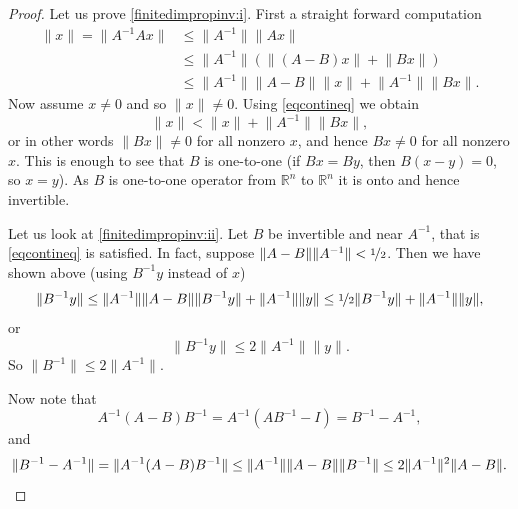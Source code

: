 \documentclass[12pt]{book}
\newcommand{\snorm}[1]{\lVert {#1} \rVert}
\newcommand{\R}{{\mathbb{R}}}
\theoremstyle{plain}
\theoremstyle{remark}
\theoremstyle{definition}
\theoremstyle{exercise}
\theoremstyle{example}
\begin{document}
\begin{proof}
Let us prove \ref{finitedimpropinv:i}.  First a straight forward computation
\begin{equation*}
\begin{split}
\snorm{x} =
\snorm{A^{-1}Ax}
& \leq
\snorm{A^{-1}} \snorm{Ax}
\\
& \leq
\snorm{A^{-1}} ( \snorm{(A-B)x} + \snorm{Bx} )
\\
& \leq
\snorm{A^{-1}}\snorm{A-B} \snorm{x} + \snorm{A^{-1}}\snorm{Bx} .
\end{split}
\end{equation*}
Now assume $x \neq 0$ and so $\snorm{x} \neq 0$.
Using \eqref{eqcontineq} we obtain
\begin{equation*}
\snorm{x} < \snorm{x} + \snorm{A^{-1}}\snorm{Bx} ,
\end{equation*}
or in other words $\snorm{Bx} \not= 0$ for all nonzero $x$, and hence
$Bx \not= 0$ for all nonzero $x$.  This is enough to see that
$B$ is one-to-one (if $Bx = By$, then $B(x-y) = 0$, so $x=y$).
As $B$ is one-to-one operator from $\R^n$ to $\R^n$ it is onto
and hence invertible.

Let us look at \ref{finitedimpropinv:ii}.  Let $B$ be invertible and near $A^{-1}$,
that is \eqref{eqcontineq} is satisfied.  In fact, 
suppose $\snorm{A-B} \snorm{A^{-1}} <  \nicefrac{1}{2}$.
Then we have shown above (using $B^{-1}y$ instead of $x$)
\begin{equation*}
\snorm{B^{-1}y} \leq 
\snorm{A^{-1}}\snorm{A-B} \snorm{B^{-1}y} + \snorm{A^{-1}}\snorm{y}
\leq
\nicefrac{1}{2} \snorm{B^{-1}y} + \snorm{A^{-1}}\snorm{y} ,
\end{equation*}
or
\begin{equation*}
\snorm{B^{-1}y} \leq 
2\snorm{A^{-1}}\snorm{y} .
\end{equation*}
So
$
\snorm{B^{-1}} \leq 2 \snorm{A^{-1}}
$.

Now note that
\begin{equation*}
A^{-1}(A-B)B^{-1} = 
A^{-1}(AB^{-1}-I) = 
B^{-1}-A^{-1} ,
\end{equation*}
and
\begin{equation*}
\snorm{B^{-1}-A^{-1}} =
\snorm{A^{-1}(A-B)B^{-1}} \leq
\snorm{A^{-1}}\snorm{A-B}\snorm{B^{-1}}
\leq
2\snorm{A^{-1}}^2
\snorm{A-B} . \qedhere
\end{equation*}
\end{proof}
\end{document}

